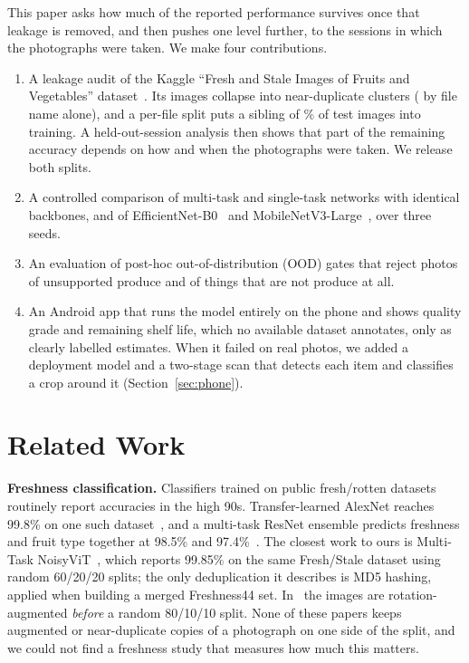 \documentclass[conference]{IEEEtran}
\begin{document}
This paper asks how much of the reported performance survives once that leakage
is removed, and then pushes one level further, to the sessions in which the
photographs were taken. We make four contributions.
\begin{enumerate}
\item A leakage audit of the Kaggle ``Fresh and Stale Images of Fruits and
Vegetables'' dataset~\cite{kaggle_fresh_stale}. Its \NImages{} images collapse
into \NGroups{} near-duplicate clusters (\NFilenameGroups{} by file name
alone), and a per-file split puts a sibling of \NaiveLeakPct\% of test images
into training. A held-out-session analysis then shows that part of the
remaining accuracy depends on how and when the photographs were taken. We
release both splits.
\item A controlled comparison of multi-task and single-task networks with
identical backbones, and of EfficientNet-B0~\cite{tan2019efficientnet} and
MobileNetV3-Large~\cite{howard2019mobilenetv3}, over three seeds.
\item An evaluation of post-hoc out-of-distribution (OOD) gates that reject
photos of unsupported produce and of things that are not produce at all.
\item An Android app that runs the model entirely on the phone and shows
quality grade and remaining shelf life, which no available dataset annotates,
only as clearly labelled estimates. When it failed on real photos, we added a
deployment model and a two-stage scan that detects each item and classifies a
crop around it (Section~\ref{sec:phone}).
\end{enumerate}

\section{Related Work}
\textbf{Freshness classification.} Classifiers trained on public fresh/rotten
datasets routinely report accuracies in the high 90s. Transfer-learned AlexNet
reaches 99.8\% on one such dataset~\cite{amin2023freshness}, and a multi-task
ResNet ensemble predicts freshness and fruit type together at 98.5\% and
97.4\%~\cite{kang2022ensemble}. The closest work to ours is Multi-Task
NoisyViT~\cite{noisyvit2025}, which reports 99.85\% on the same Fresh/Stale
dataset using random 60/20/20 splits; the only deduplication it describes is MD5
hashing, applied when building a merged Freshness44 set. In~\cite{amin2023freshness}
the images are rotation-augmented \emph{before} a random 80/10/10 split. None of
these papers keeps augmented or near-duplicate copies of a photograph on one
side of the split, and we could not find a freshness study that measures how
much this matters.
\end{document}
